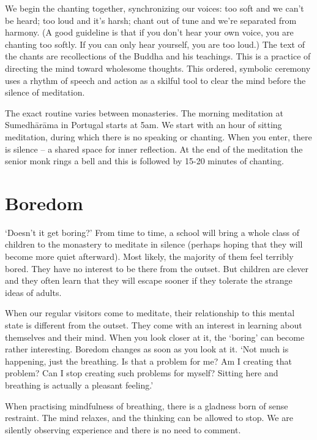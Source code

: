 We begin the chanting together, synchronizing our voices: too soft and
we can't be heard; too loud and it's harsh; chant out of tune and we're
separated from harmony. (A good guideline is that if you don't hear your
own voice, you are chanting too softly. If you can only hear yourself,
you are too loud.) The text of the chants are recollections of the
Buddha and his teachings. This is a practice of directing the mind
toward wholesome thoughts. This ordered, symbolic ceremony uses a rhythm
of speech and action as a skilful tool to clear the mind before the
silence of meditation.

The exact routine varies between monasteries. The morning meditation at
Sumedhārāma in Portugal starts at 5am. We start with an hour of sitting
meditation, during which there is no speaking or chanting. When you
enter, there is silence -- a shared space for inner reflection. At the
end of the meditation the senior monk rings a bell and this is followed
by 15-20 minutes of chanting.

\section{Boredom}


\noindent `Doesn't it get boring?' From time to time, a school will
bring a whole class of children to the monastery to meditate in silence
(perhaps hoping that they will become more quiet afterward). Most
likely, the majority of them feel terribly bored. They have no interest
to be there from the outset. But children are clever and they often
learn that they will escape sooner if they tolerate the strange ideas of
adults.

When our regular visitors come to meditate, their relationship to this
mental state is different from the outset. They come with an interest in
learning about themselves and their mind. When you look closer at it,
the `boring' can become rather interesting. Boredom changes as soon as
you look at it. `Not much is happening, just the breathing. Is that a
problem for me? Am I creating that problem? Can I stop creating such
problems for myself? Sitting here and breathing is actually a pleasant
feeling.'

When practising mindfulness of breathing, there is a gladness born of
sense restraint. The mind relaxes, and the thinking can be allowed to
stop. We are silently observing experience and there is no need to
comment.

